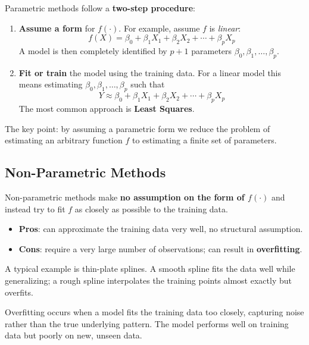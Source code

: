 \documentclass[11pt,a4paper]{article}
\theoremstyle{definition}
\theoremstyle{plain}
\theoremstyle{remark}
\begin{document}
Parametric methods follow a \textbf{two-step procedure}:

\begin{enumerate}
    \item \textbf{Assume a form} for $f(\cdot)$. For example, assume $f$ is \textit{linear}:
    \[
        f(X) = \beta_0 + \beta_1 X_1 + \beta_2 X_2 + \cdots + \beta_p X_p
    \]
    A model is then completely identified by $p+1$ parameters $\beta_0, \beta_1, \ldots, \beta_p$.
    \item \textbf{Fit or train} the model using the training data. For a linear model this means estimating $\beta_0, \beta_1, \ldots, \beta_p$ such that
    \[
        Y \approx \beta_0 + \beta_1 X_1 + \beta_2 X_2 + \cdots + \beta_p X_p
    \]
    The most common approach is \textbf{Least Squares}.
\end{enumerate}

The key point: by assuming a parametric form we reduce the problem of estimating an arbitrary function $f$ to estimating a finite set of parameters.

\subsection{Non-Parametric Methods}

Non-parametric methods make \textbf{no assumption on the form of $f(\cdot)$} and instead try to fit $f$ as closely as possible to the training data.

\begin{itemize}
    \item \textbf{Pros}: can approximate the training data very well, no structural assumption.
    \item \textbf{Cons}: require a very large number of observations; can result in \textbf{overfitting}.
\end{itemize}

A typical example is thin-plate splines. A smooth spline fits the data well while generalizing; a rough spline interpolates the training points almost exactly but overfits.

\begin{tcolorbox}[colback=orange!5!white,colframe=orange!75!black,title=\textbf{Overfitting}]
Overfitting occurs when a model fits the training data too closely, capturing noise rather than the true underlying pattern. The model performs well on training data but poorly on new, unseen data.
\end{tcolorbox}
\end{document}
